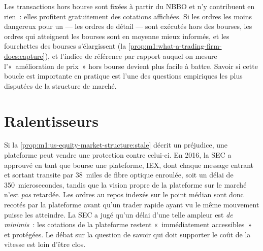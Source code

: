 \begin{omfigure}

\end{omfigure}

\begin{remark}\label{rem:m1:us-equity-market-structure:free}
Les transactions hors bourse sont fixées à partir du NBBO et n'y contribuent en rien~:
elles profitent gratuitement des cotations affichées. Si les ordres les moins dangereux pour un
 --- les ordres de détail --- sont exécutés hors des bourses, les ordres
qui atteignent les bourses sont en moyenne mieux informés, et les fourchettes des bourses
s'élargissent (la \cref{prop:m1:what-a-trading-firm-does:capture}), et l'indice de référence
par rapport auquel on mesure l'«~amélioration de prix~» hors bourse devient plus facile
à battre. Savoir si cette boucle est importante en pratique est l'une des questions
empiriques les plus disputées de la structure de marché.
\end{remark}

\section{Ralentisseurs}

Si la \cref{prop:m1:us-equity-market-structure:stale} décrit un préjudice, une plateforme
peut vendre une protection contre celui-ci. En 2016, la SEC a approuvé en tant que bourse une plateforme,
IEX, dont chaque message entrant et sortant transite par 38~miles de
fibre optique enroulée, soit un délai de 350~microsecondes, tandis que la vision propre
de la plateforme sur le marché n'est \emph{pas} retardée. Les ordres au repos indexés sur le point médian
sont donc recotés par la plateforme avant qu'un trader rapide ayant vu le
même mouvement puisse les atteindre. La SEC a jugé qu'un délai d'une telle ampleur est
\emph{de minimis}~: les cotations de la plateforme restent «~immédiatement accessibles~»
et protégées. Le débat sur la question de savoir qui doit supporter le coût de la vitesse est loin
d'être clos.

